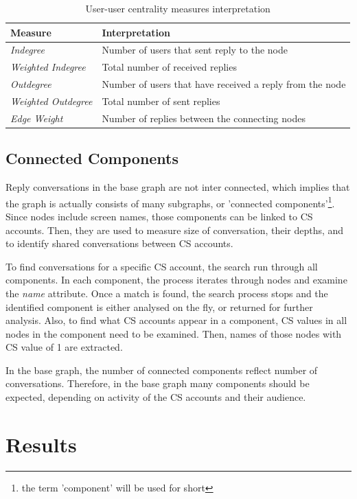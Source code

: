 \documentclass[sigconf]{acmart}
\begin{document}
\begin{table}[!h]
\centering
\begin{tabularx}{\columnwidth}{lX}
\toprule
\textbf{Measure} & \textbf{Interpretation} \\ 
\midrule
{\emph{Indegree}} & Number of users that sent reply to the node \\
{\emph{Weighted Indegree}} & Total number of received replies \\
{\emph{Outdegree}} & Number of users that have received a reply from
                     the node \\ 
{\emph{Weighted Outdegree}} & Total number of sent replies \\
{\emph{Edge Weight}}& Number of replies between the connecting nodes\\
\bottomrule
\end{tabularx}
\caption{User-user centrality measures interpretation}
\label{tbl:uucentralitymeasuresinter}
\end{table}

\subsection{Connected Components}

Reply conversations in the base graph are not inter connected, 
which implies that the graph is actually consists of many 
subgraphs, or 'connected components'{\footnote{the term 
'component' will be used for short}}. Since nodes include 
screen names, those components can be linked to CS accounts. Then,  
they are used to measure size of conversation, their
depths, and to identify shared conversations between CS
accounts. 

To find conversations for a specific CS account, the search run through all
components. In each component, the process iterates through nodes and 
examine the {\emph{name}} attribute. Once a match is found, the search 
process stops and the identified component is either analysed on the fly, or
returned for further analysis. Also, to find what CS accounts appear in 
a component, CS values in all nodes in the component need to be examined. 
Then, names of those nodes with CS value of 1 are extracted.

In the base graph, the number of connected components reflect number of
conversations. Therefore, in the base graph many components
should be expected, depending on activity of the CS
accounts and their audience.


\section{Results}\label{results}
\end{document}
